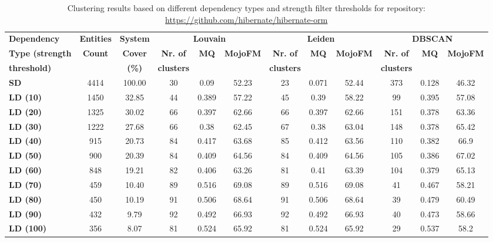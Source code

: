 \documentclass{ieeeaccess}
\begin{document}
\begin{table}[htbp]
\centering
\caption{Clustering results based on different dependency types and strength filter thresholds for repository: \href{https://github.com/hibernate/hibernate-orm}{https://github.com/hibernate/hibernate-orm}}
\label{tab:clustering_results_hibernate}
\setlength{\tabcolsep}{7pt} 
\begin{tabular}{|l|c|c|ccc|ccc|ccc|}
\hline
 \textbf{Dependency} &  \textbf{Entities} & \textbf{System} & \multicolumn{3}{c|}{\textbf{Louvain}} & \multicolumn{3}{c|}{\textbf{Leiden}} & \multicolumn{3}{c|}{\textbf{DBSCAN}} \\
\cline{4-12}
\textbf{Type (strength } &  \textbf{Count} & \textbf{Cover} & \textbf{Nr. of } & \textbf{MQ} & \textbf{MojoFM} & \textbf{Nr. of} & \textbf{MQ} & \textbf{MojoFM} & \textbf{Nr. of} & \textbf{MQ} & \textbf{MojoFM}  \\
\textbf{threshold)} &  & \textbf{(\%)} & \textbf{clusters} & & & \textbf{clusters} & &  & \textbf{clusters} & &\\
\hline
\rowcolor[HTML]{ECECEC} \textbf{SD} & 4414 & 100.00 & 30 & 0.09 & 52.23 & 23 & 0.071 & 52.44 & 373 & 0.128 & 46.32  \\
\textbf{LD (10)} & 1450 & 32.85 & 44 & 0.389 & 57.22 & 45 & 0.39 & 58.22 & 99 & 0.395 & 57.08 \\
\textbf{LD (20)} & 1325 & 30.02 & 66 & 0.397 & 62.66 & 66 & 0.397 & 62.66 & 151 & 0.378 & 63.36 \\
\textbf{LD (30)} & 1222 & 27.68 & 66 & 0.38 & 62.45 & 67 & 0.38 & 63.04 & 148 & 0.378 & 65.42 \\
\textbf{LD (40)} & 915 & 20.73 & 84 & 0.417 & 63.68 & 85 & 0.412 & 63.56 & 110 & 0.382 & 66.9 \\
\textbf{LD (50)} & 900 & 20.39 & 84 & 0.409 & 64.56 & 84 & 0.409 & 64.56 & 105 & 0.386 & 67.02 \\
\textbf{LD (60)} & 848 & 19.21 & 82 & 0.406 & 63.26 & 81 & 0.41 & 63.39 & 104 & 0.379 & 65.13 \\
\textbf{LD (70)} & 459 & 10.40 & 89 & 0.516 & \cellcolor[HTML]{fef9e4}69.08 & 89 & 0.516 & \cellcolor[HTML]{fef9e4}69.08 & 41 & 0.467 & 58.21 \\
\textbf{LD (80)} & 450 & 10.19 & 91 & 0.506 & 68.64 & 91 & 0.506 & 68.64 & 39 & 0.479 & \cellcolor[HTML]{fef9e4}60.49 \\
\textbf{LD (90)} & 432 & 9.79 & 92 & 0.492 & 66.93 & 92 & 0.492 & 66.93 & 40 & 0.473 & 58.66 \\
\textbf{LD (100)} & 356 & 8.07 & 81 & \cellcolor[HTML]{fef9e4}0.524 & 65.92 & 81 & \cellcolor[HTML]{fef9e4}0.524 & 65.92 & 29 & \cellcolor[HTML]{fef9e4}0.537 & 58.2 \\

\end{tabular}
\end{table}
\end{document}
